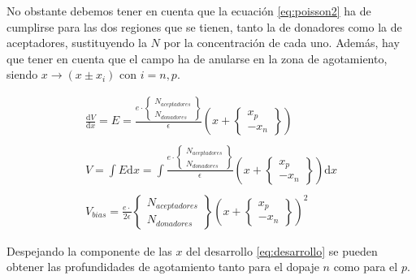 \documentclass[twoside]{article}
\begin{document}
			No obstante debemos tener en cuenta que la ecuación \ref{eq:poisson2} ha de cumplirse para las dos regiones que se tienen, tanto la de donadores como la de aceptadores, sustituyendo la $N$ por la concentración de cada uno. Además, hay que tener en cuenta que el campo ha de anularse en la zona de agotamiento, siendo $x \rightarrow (x \pm x_i) \textrm{ con } i = n, p$.

				\begin{equation}
					\begin{matrix}
						\frac{\mathrm{d}V} {\mathrm{d}x} = E = \frac{e \cdot  
						\begin{Bmatrix}
							N_{aceptadores} \\ N_{donadores}
						\end{Bmatrix}} {\epsilon}\left(x +  
						\begin{Bmatrix}
							x_p \\ -x_n
						\end{Bmatrix}\right)

						\\
						\\

						V  = \int E \mathrm{d}x = \int \frac{e \cdot  
						\begin{Bmatrix}
							N_{aceptadores} \\ N_{donadores}
						\end{Bmatrix}} {\epsilon}\left(x +  
						\begin{Bmatrix}
							x_p \\ -x_n
						\end{Bmatrix}\right)\mathrm{d}x

						\\
						\\

						V_{bias} = \frac{e \cdot  } {2\epsilon}
						\begin{Bmatrix}
							N_{aceptadores} \\ N_{donadores}
						\end{Bmatrix} \left(x +  
						\begin{Bmatrix}
							x_p \\ -x_n
						\end{Bmatrix}\right)^2
					\end{matrix}
					\label{eq:desarrollo}
				\end{equation}

			Despejando la componente de las $x$ del desarrollo \ref{eq:desarrollo} se pueden obtener las profundidades de agotamiento tanto para el dopaje $n$ como para el $p$.
\end{document}
